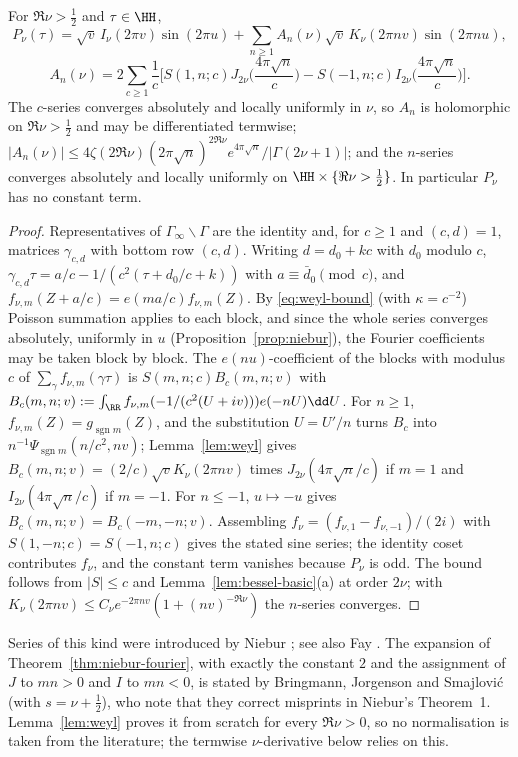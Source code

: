 \begin{theorem}\label{thm:niebur-fourier}
For $\Re\nu>\frac12$ and $\tau\in\HH$,
\[
P_\nu(\tau)=\sqrt v\,I_\nu(2\pi v)\sin(2\pi u)+\sum_{n\ge1}A_n(\nu)\sqrt v\,K_\nu(2\pi nv)\sin(2\pi nu),
\]
\[
A_n(\nu)=2\sum_{c\ge1}\frac1c\Big[S(1,n;c)J_{2\nu}\Big(\frac{4\pi\sqrt n}c\Big)-S(-1,n;c)I_{2\nu}\Big(\frac{4\pi\sqrt n}c\Big)\Big].
\]
The $c$-series converges absolutely and locally uniformly in $\nu$, so $A_n$ is holomorphic on $\Re\nu>\frac12$ and may be differentiated
termwise; $|A_n(\nu)|\le4\zeta(2\Re\nu)(2\pi\sqrt n)^{2\Re\nu}e^{4\pi\sqrt n}/|\Gamma(2\nu+1)|$; and the $n$-series converges absolutely and locally
uniformly on $\HH\times\{\Re\nu>\frac12\}$. In particular $P_\nu$ has no constant term.
\end{theorem}

\begin{proof}
Representatives of $\Gamma_\infty\backslash\Gamma$ are the identity and, for $c\ge1$ and $(c,d)=1$, matrices $\gamma_{c,d}$ with bottom row
$(c,d)$. Writing $d=d_0+kc$ with $d_0$ modulo $c$, $\gamma_{c,d}\tau=a/c-1/(c^2(\tau+d_0/c+k))$ with $a\equiv\bar d_0\pmod c$, and
$f_{\nu,m}(Z+a/c)=e(ma/c)f_{\nu,m}(Z)$. By \eqref{eq:weyl-bound} (with $\kappa=c^{-2}$) Poisson summation applies to each block, and since the
whole series converges absolutely, uniformly in $u$ (Proposition~\ref{prop:niebur}), the Fourier coefficients may be taken block by block. The
$e(nu)$-coefficient of the blocks with modulus $c$ of $\sum_\gamma f_{\nu,m}(\gamma\tau)$ is $S(m,n;c)B_c(m,n;v)$ with
$B_c(m,n;v):=\int_\RR f_{\nu,m}(-1/(c^2(U+iv)))e(-nU)\dd U$. For $n\ge1$, $f_{\nu,m}(Z)=g_{\operatorname{sgn}m}(Z)$, and the substitution
$U=U'/n$ turns $B_c$ into $n^{-1}\Psi_{\operatorname{sgn}m}(n/c^2,nv)$; Lemma~\ref{lem:weyl} gives
$B_c(m,n;v)=(2/c)\sqrt vK_\nu(2\pi nv)$ times $J_{2\nu}(4\pi\sqrt n/c)$ if $m=1$ and $I_{2\nu}(4\pi\sqrt n/c)$ if $m=-1$. For $n\le-1$, $u\mapsto-u$ gives
$B_c(m,n;v)=B_c(-m,-n;v)$. Assembling $f_\nu=(f_{\nu,1}-f_{\nu,-1})/(2i)$ with $S(1,-n;c)=S(-1,n;c)$ gives the stated sine series; the identity
coset contributes $f_\nu$, and the constant term vanishes because $P_\nu$ is odd. The bound follows from $|S|\le c$ and
Lemma~\ref{lem:bessel-basic}(a) at order $2\nu$; with $K_\nu(2\pi nv)\le C_\nu e^{-2\pi nv}(1+(nv)^{-\Re\nu})$ the $n$-series converges.
\end{proof}

\begin{remark}\label{rem:niebur-lit}
Series of this kind were introduced by Niebur \cite{Nie73}; see also Fay \cite{Fay77}. The expansion of Theorem~\ref{thm:niebur-fourier},
with exactly the constant $2$ and the assignment of $J$ to $mn>0$ and $I$ to $mn<0$, is stated by Bringmann, Jorgenson and Smajlovi\'c
\cite[\S2.4]{BJS25} (with $s=\nu+\frac12$), who note that they correct misprints in Niebur's Theorem~1. Lemma~\ref{lem:weyl} proves it from
scratch for every $\Re\nu>0$, so no normalisation is taken from the literature; the termwise $\nu$-derivative below relies on this.
\end{remark}

